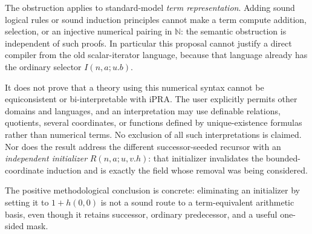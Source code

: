 The obstruction applies to standard-model \emph{term representation}.
Adding sound logical rules or sound induction principles cannot make a
term compute addition, selection, or an injective numerical pairing in
$\mathbb N$: the semantic obstruction is independent of such proofs.
In particular this proposal cannot justify a direct compiler from the
old scalar-iterator language, because that language already has the
ordinary selector $I(n,a;u.b)$.

It does not prove that a theory using this numerical syntax cannot be
equiconsistent or bi-interpretable with iPRA.  The user explicitly permits
other domains and languages, and an interpretation may use definable
relations, quotients, several coordinates, or functions defined by
unique-existence formulas rather than numerical terms.  No exclusion of
all such interpretations is claimed.  Nor does the result address the
different successor-seeded recursor with an \emph{independent initializer}
$R(n,a;u,v.h)$: that initializer invalidates the bounded-coordinate
induction and is exactly the field whose removal was being considered.

The positive methodological conclusion is concrete: eliminating an
initializer by setting it to $1+h(0,0)$ is not a sound route to a
term-equivalent arithmetic basis, even though it retains successor,
ordinary predecessor, and a useful one-sided mask.
